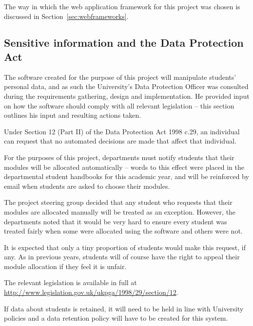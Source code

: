 \documentclass[]{scrartcl}
\begin{document}
The way in which the web application framework for this project was chosen is
discussed in Section~\ref{sec:webframeworks}.

\subsection{Sensitive information and the Data Protection Act}
\label{sec:dataprotection}


The software created for the purpose of this project will manipulate students'
personal data, and as such the University's Data Protection Officer was
consulted during the requirements gathering, design and implementation. He
provided input on how the software should comply with all relevant legislation
-- this section outlines his input and resulting actions taken.


Under Section 12 (Part II) of the Data Protection Act 1998 c.29, an individual
can request that no automated decisions are made that affect that individual.

For the purposes of this project, departments must notify students that their
modules will be allocated automatically -- words to this effect were placed in
the departmental student handbooks for this academic year, and will be
reinforced by email when students are asked to choose their modules.

The project steering group decided that any student who requests that their
modules are allocated manually will be treated as an exception. However, the
departments noted that it would be very hard to ensure every student was
treated fairly when some were allocated using the software and others were
not.

It is expected that only a tiny proportion of students would make this
request, if any. As in previous years, students will of course have the right
to appeal their module allocation if they feel it is unfair.

The relevant legislation is available in full at
\url{http://www.legislation.gov.uk/ukpga/1998/29/section/12}.


If data about students is retained, it will need to be held in line with
University policies and a data retention policy will have to be created for
this system.
\end{document}
